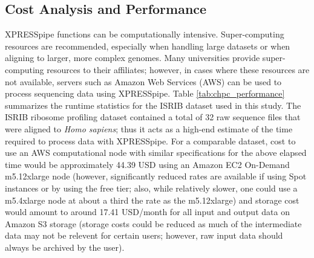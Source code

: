\documentclass[10pt, oneside]{article}
\begin{document}
\subsection*{Cost Analysis and Performance}
XPRESSpipe functions can be computationally intensive. Super-computing resources are recommended, especially when handling large datasets or when aligning to larger, more complex genomes. Many universities provide super-computing resources to their affiliates; however, in cases where these resources are not available, servers such as Amazon Web Services (AWS) \cite{aws} can be used to process sequencing data using XPRESSpipe. Table \ref{tab:chpc_performance} summarizes the runtime statistics for the ISRIB dataset used in this study. The ISRIB ribosome profiling dataset contained a total of 32 raw sequence files that were aligned to \textit{Homo sapiens}; thus it acts as a high-end estimate of the time required to process data with XPRESSpipe. For a comparable dataset, cost to use an AWS computational node with similar specifications for the above elapsed time would be approximately 44.39 USD using an Amazon EC2 On-Demand m5.12xlarge node (however, significantly reduced rates are available if using Spot instances or by using the free tier; also, while relatively slower, one could use a m5.4xlarge node at about a third the rate as the m5.12xlarge) and storage cost would amount to around 17.41 USD/month for all input and output data on Amazon S3 storage (storage costs could be reduced as much of the intermediate data may not be relevent for certain users; however, raw input data should always be archived by the user). \\
\end{document}
